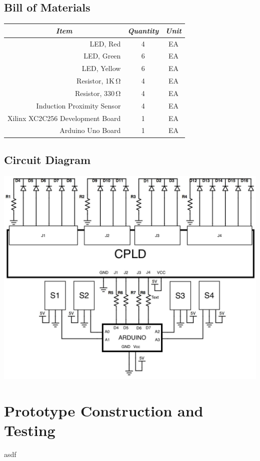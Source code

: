 \subsection{Bill of Materials}
\begin{table}[h]
\begin{tabular}{|r|c|c|}
\hline
\multicolumn{1}{|c|}{\textit{Item}} & \textit{Quantity} & \textit{Unit} \\ \hline
LED, Red & 4 & EA \\ \hline
LED, Green & 6 & EA \\ \hline
LED, Yellow & 6 & EA \\ \hline
Resistor, 1K$\,\mathrm\Omega$ & 4 & EA \\ \hline
Resistor, 330$\,\mathrm\Omega$ & 4 & EA \\ \hline
Induction Proximity Sensor & 4 & EA \\ \hline
Xilinx XC2C256 Development Board & 1 & EA \\ \hline
Arduino Uno Board & 1 & EA \\ \hline
\end{tabular}
\end{table}

\subsection{Circuit Diagram}
\includegraphics[scale=0.50]{0623151841.jpg}

\section{Prototype Construction and Testing}

asdf
